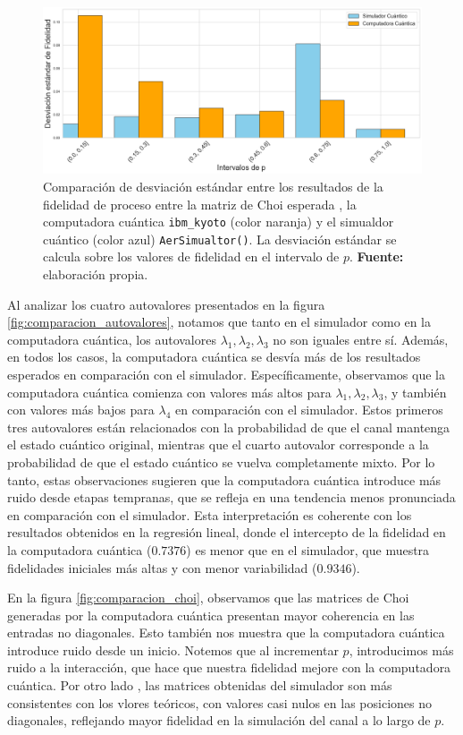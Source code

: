 \documentclass[letterpaper,12pt]{thesisECFM}
\theoremstyle{plain}
\theoremstyle{definition}
\theoremstyle{remark}
\newcommand{\1}{\mathbb{1}}
\begin{document}
\begin{figure}[h!]
    \centering
    \includegraphics[width=0.95\linewidth]{imagenes/Comparacion_desviaciones.png}
    \caption{Comparación de desviación estándar entre los resultados de la fidelidad de proceso entre la matriz de Choi esperada , la computadora cuántica \texttt{ibm\_kyoto} (color naranja) y el simualdor cuántico (color azul) \texttt{AerSimualtor()}. La desviación estándar se calcula sobre los valores de fidelidad en el intervalo de $p$. \textbf{Fuente:} elaboración propia.}
    \label{fig:comparacion_desviaciones}
\end{figure}


Al analizar los cuatro autovalores presentados en la figura
\ref{fig:comparacion_autovalores}, notamos que tanto en el simulador como en la
computadora cuántica, los autovalores $\lambda_1,\lambda_2,\lambda_3$ no son
iguales entre sí. Además, en todos los casos, la computadora cuántica se desvía
más de los resultados esperados en comparación con el simulador.
Específicamente, observamos que la computadora cuántica comienza con valores
más altos para $\lambda_1,\lambda_2,\lambda_3$, y también con valores más bajos
para $\lambda_4$ en comparación con el simulador.  Estos primeros tres
autovalores están relacionados con la probabilidad de que el canal mantenga el
estado cuántico original, mientras que el cuarto autovalor corresponde a la
probabilidad de que el estado cuántico se vuelva completamente mixto. Por lo
tanto, estas observaciones sugieren que la computadora cuántica introduce más
ruido desde etapas tempranas, que se refleja en una tendencia menos pronunciada
en comparación con el simulador. Esta interpretación es coherente con los
resultados obtenidos en la regresión lineal, donde el intercepto de la
fidelidad en la computadora cuántica ($0.7376$) es menor que en el simulador,
que muestra fidelidades iniciales más altas y con menor variabilidad
($0.9346$).

 
En la figura \ref{fig:comparacion_choi}, observamos que las matrices de Choi
generadas por la computadora cuántica presentan mayor coherencia en las
entradas no diagonales. Esto también nos muestra que la computadora cuántica
introduce ruido desde un inicio. Notemos que al incrementar $p$, introducimos
más ruido a la interacción, que hace que nuestra fidelidad mejore con la
computadora cuántica. Por otro lado , las matrices obtenidas del simulador son
más consistentes con los vlores teóricos, con valores casi nulos en las
posiciones no diagonales, reflejando mayor fidelidad en la simulación del canal
a lo largo de $p$.
\end{document}
